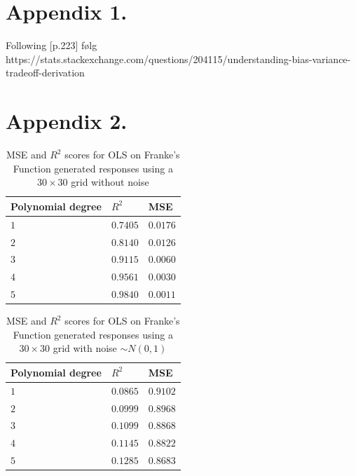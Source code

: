 \documentclass[%
oneside,                 %
final,                   %
10pt]{article}
\begin{document}
\begin{appendices}
\section*{Appendix 1.} \label{APP_1}
Following \citep{HastieTrevor2009TEoS}[p.223]
følg https://stats.stackexchange.com/questions/204115/understanding-bias-variance-tradeoff-derivation

\section*{Appendix 2.} \label{APP_2}
\begin{table}[h!]
\begin{center}
\begin{tabular}{lll}
\hline
 Polynomial degree   & $R^2$      & MSE        \\
\hline
 $ 1 $               & $ 0.7405 $ & $ 0.0176 $ \\
 $ 2 $               & $ 0.8140 $ & $ 0.0126 $ \\
 $ 3 $               & $ 0.9115 $ & $ 0.0060 $ \\
 $ 4 $               & $ 0.9561 $ & $ 0.0030 $ \\
 $ 5 $               & $ 0.9840 $ & $ 0.0011 $ \\
\hline
\end{tabular}
\end{center}
\caption{MSE and $R^2$ scores for OLS on  Franke's Function generated responses using a $30\times 30$ grid without noise}
\label{table:OLS_mse_r2}
\end{table}

\begin{table}[h!]
\begin{center}
\begin{tabular}{lll}
\hline
 Polynomial degree   & $R^2$      & MSE        \\
\hline
 $ 1 $               & $ 0.0865 $ & $ 0.9102 $ \\
 $ 2 $               & $ 0.0999 $ & $ 0.8968 $ \\
 $ 3 $               & $ 0.1099 $ & $ 0.8868 $ \\
 $ 4 $               & $ 0.1145 $ & $ 0.8822 $ \\
 $ 5 $               & $ 0.1285 $ & $ 0.8683 $ \\
\hline
\end{tabular}
\end{center}
\caption{MSE and $R^2$ scores for OLS on  Franke's Function generated responses using a $30\times 30$ grid with noise $\sim N(0,1)$ }
\label{table:OLS_mse_r2}
\end{table}

\end{appendices}
\end{document}
